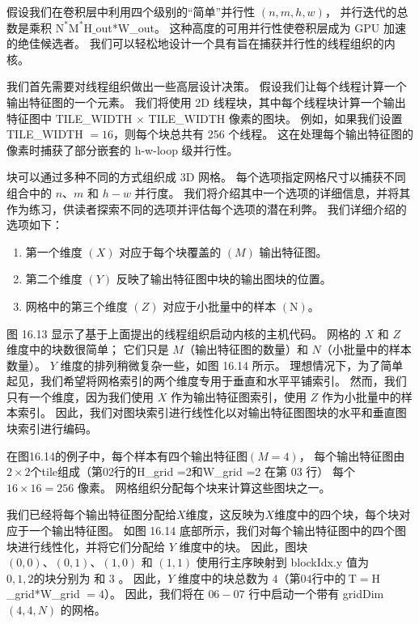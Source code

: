 假设我们在卷积层中利用四个级别的“简单”并行性 $(n, m, h, w)$，
并行迭代的总数是乘积 $\mathrm{N}^{*} \mathrm{ M}^{*} \mathrm{H} \_$out*W\_out。 
这种高度的可用并行性使卷积层成为 GPU 加速的绝佳候选者。 我们可以轻松地设计一个具有旨在捕获并行性的线程组织的内核。

我们首先需要对线程组织做出一些高层设计决策。 假设我们让每个线程计算一个输出特征图的一个元素。 
我们将使用 2D 线程块，其中每个线程块计算一个输出特征图中 TILE\_WIDTH $\times$ TILE\_WIDTH 像素的图块。 
例如，如果我们设置 TILE\_WIDTH $=16$，则每个块总共有 256 个线程。 
这在处理每个输出特征图的像素时捕获了部分嵌套的 h-w-loop 级并行性。

块可以通过多种不同的方式组织成 3D 网格。 每个选项指定网格尺寸以捕获不同组合中的 $n、m$ 和 $h-w$ 并行度。 
我们将介绍其中一个选项的详细信息，并将其作为练习，供读者探索不同的选项并评估每个选项的潜在利弊。 我们详细介绍的选项如下：
\begin{enumerate}
   \item 第一个维度 $(X)$ 对应于每个块覆盖的 $(M)$ 输出特征图。

   \item 第二个维度 $(Y)$ 反映了输出特征图中块的输出图块的位置。

   \item 网格中的第三个维度 $(Z)$ 对应于小批量中的样本 $(\mathrm{N})$。
\end{enumerate}

图 16.13 显示了基于上面提出的线程组织启动内核的主机代码。 网格的 $X$ 和 $Z$ 维度中的块数很简单； 
它们只是 $M$（输出特征图的数量）和 $N$（小批量中的样本数量）。 $Y$ 维度的排列稍微复杂一些，如图 16.14 所示。 
理想情况下，为了简单起见，我们希望将网格索引的两个维度专用于垂直和水平平铺索引。 
然而，我们只有一个维度，因为我们使用 $X$ 作为输出特征图索引，使用 $Z$ 作为小批量中的样本索引。 
因此，我们对图块索引进行线性化以对输出特征图图块的水平和垂直图块索引进行编码。

在图16.14的例子中，每个样本有四个输出特征图$(M=4)$，
每个输出特征图由$2 \times 2$个tile组成（第02行的H\_grid =2和W\_grid =2 在第 03 行）
每个 $16 \times 16=256$ 像素。 网格组织分配每个块来计算这些图块之一。

我们已经将每个输出特征图分配给$X$维度，这反映为$X$维度中的四个块，每个块对应于一个输出特征图。 
如图 16.14 底部所示，我们对每个输出特征图中的四个图块进行线性化，并将它们分配给 $Y$ 维度中的块。 
因此，图块 $(0,0)、(0,1)、(1,0)$ 和 $(1,1)$ 使用行主序映射到 blockIdx.y 值为 $0,1,2 的块 分别为 $ 和 3 。 
因此，$Y$ 维度中的块总数为 $4（第 04 行中的 \mathrm{~T}=\mathrm{H}$ \_grid*W\_grid $=4$）。 
因此，我们将在 $06-07$ 行中启动一个带有 gridDim $(4,4, N)$ 的网格。

